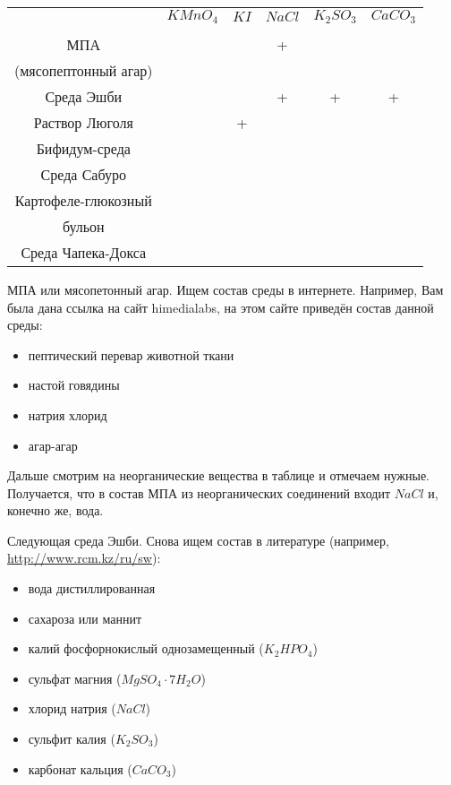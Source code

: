 \begin{table}[h]
    \small
    \begin{tabular}{|c|c|c|c|c|c|}
        \hline 
        & $KMnO_4$ & $KI$ & $NaCl$ & $K_2SO_3$ & $CaCO_3$ \\
        & & & & & \\
        \hline
        МПА & & & + & & \\
        (мясопептонный агар) & & & & & \\
        \hline
        Среда Эшби & & & + & + & + \\
        \hline
        Раствор Люголя & & + & & & \\
        \hline
        Бифидум-среда & & & & & \\
        \hline
        Среда Сабуро & & & & & \\
        \hline
        Картофеле-глюкозный & & & & & \\
        бульон & & & & & \\
        \hline
        Среда Чапека-Докса & & & & & \\
        \hline
    \end{tabular}
    \end{table}

\explanationSection

МПА или мясопетонный агар. Ищем состав среды в интернете. Например, Вам была дана ссылка на сайт himedialabs, 
на этом сайте приведён состав данной среды: 
\begin{itemize} 
    \item пептический перевар животной ткани
    \item настой говядины
    \item натрия хлорид
    \item агар-агар
\end{itemize}

Дальше смотрим на неорганические вещества в таблице и отмечаем нужные. Получается, что в состав МПА из неорганических соединений входит 
$NaCl$ и, конечно же, вода. 

Следующая среда Эшби. 
Снова ищем состав в литературе (например, \url{http://www.rcm.kz/ru/sw}):
\begin{itemize}
    \item вода дистиллированная
    \item сахароза или маннит
    \item калий фосфорнокислый однозамещенный ($K_2HPO_4$) 
    \item сульфат магния ($MgSO_4 \cdot 7H_2O$) 
    \item хлорид натрия ($NaCl$) 
    \item сульфит калия ($K_2SO_3$) 
    \item карбонат кальция ($CaCO_3$) 
\end{itemize}

